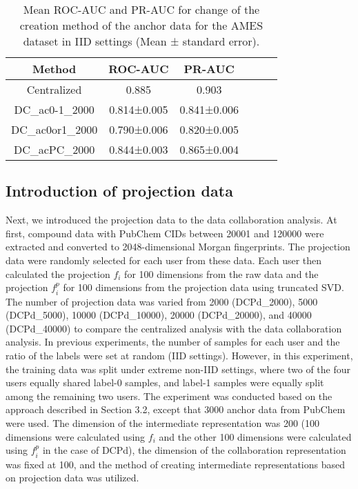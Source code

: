 \documentclass{article}
\begin{document}
\begin{table}[htbp]
\centering
\caption{Mean ROC-AUC and PR-AUC for change of the creation method of the anchor data for the AMES dataset in IID settings (Mean ± standard error).}
  \label{tab:Table 1}
  \begin{tabular}{cccccc}
    \hline
Method & ROC-AUC & PR-AUC \\ 
    \hline
Centralized & 0.885 & 0.903 \\ 
DC\_ac0-1\_2000 & 0.814±0.005 & 0.841±0.006 \\ 
DC\_ac0or1\_2000 & 0.790±0.006 & 0.820±0.005 \\ 
DC\_acPC\_2000 & 0.844±0.003 & 0.865±0.004 \\ 
    \hline
\end{tabular}
\end{table}

\subsection{Introduction of projection data}
\label{sec:sample1}
Next, we introduced the projection data to the data collaboration analysis. At first, compound data with PubChem CIDs between 20001 and 120000 were extracted and converted to 2048-dimensional Morgan fingerprints. The projection data were randomly selected for each user from these data. Each user then calculated the projection $f_{i}$ for 100 dimensions from the raw data and the projection $f^{p}_{i}$ for 100 dimensions from the projection data using truncated SVD. The number of projection data was varied from 2000 (DCPd\_2000), 5000 (DCPd\_5000), 10000 (DCPd\_10000), 20000 (DCPd\_20000), and 40000 (DCPd\_40000) to compare the centralized analysis with the data collaboration analysis. In previous experiments, the number of samples for each user and the ratio of the labels were set at random (IID settings). However, in this experiment, the training data was split under extreme non-IID settings, where two of the four users equally shared label-0 samples, and label-1 samples were equally split among the remaining two users. The experiment was conducted based on the approach described in Section 3.2, except that 3000 anchor data from PubChem were used. The dimension of the intermediate representation was 200 (100 dimensions were calculated using $f_{i}$ and the other 100 dimensions were calculated using $f^{p}_{i}$ in the case of DCPd), the dimension of the collaboration representation was fixed at 100, and the method of creating intermediate representations based on projection data was utilized.
\end{document}
